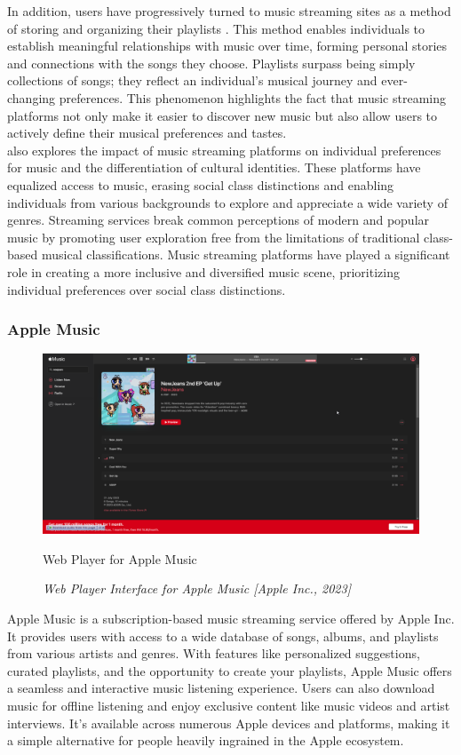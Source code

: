 In addition, users have progressively turned to music streaming sites as a method of storing and organizing their playlists \parencite{ellis20}. This method enables individuals to establish meaningful relationships with music over time, forming personal stories and connections with the songs they choose. Playlists surpass being simply collections of songs; they reflect an individual's musical journey and ever-changing preferences. This phenomenon highlights the fact that music streaming platforms not only make it easier to discover new music but also allow users to actively define their musical preferences and tastes. \\

\textcite{webster19} also explores the impact of music streaming platforms on individual preferences for music and the differentiation of cultural identities. These platforms have equalized access to music, erasing social class distinctions and enabling individuals from various backgrounds to explore and appreciate a wide variety of genres. Streaming services break common perceptions of modern and popular music by promoting user exploration free from the limitations of traditional class-based musical classifications. Music streaming platforms have played a significant role in creating a more inclusive and diversified music scene, prioritizing individual preferences over social class distinctions. \pagebreak

\subsubsection{Apple Music}
\begin{figure}[h]
    \centering
    \includegraphics[width=1.0\linewidth]{mainmatter/images/musicplat1.png}
    \caption{Web Player for Apple Music}
    \caption*{\textit{Web Player Interface for Apple Music [Apple Inc., 2023]}}
    \label{fig:myfig6}
\end{figure}
Apple Music is a subscription-based music streaming service offered by Apple Inc. It provides users with access to a wide database of songs, albums, and playlists from various artists and genres. With features like personalized suggestions, curated playlists, and the opportunity to create your playlists, Apple Music offers a seamless and interactive music listening experience. Users can also download music for offline listening and enjoy exclusive content like music videos and artist interviews. It's available across numerous Apple devices and platforms, making it a simple alternative for people heavily ingrained in the Apple ecosystem. \pagebreak

